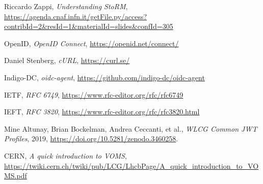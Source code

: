 \begin{thebibliography}{99}
	Riccardo Zappi, \textit{Understanding StoRM},
	\url{https://agenda.cnaf.infn.it/getFile.py/access?contribId=2&resId=1&materialId=slides&confId=305}

	OpenID, 
	\textit{OpenID Connect},
	\url{https://openid.net/connect/}

	Daniel Stenberg, \textit{cURL}, 
	\url{https://curl.se/}

	Indigo-DC, \textit{oidc-agent}, 
	\url{https://github.com/indigo-dc/oidc-agent}

	IETF, 
	\textit{RFC 6749},
	\url{https://www.rfc-editor.org/rfc/rfc6749}

	IEFT,
	\textit{RFC 3820},
	\url{https://www.rfc-editor.org/rfc/rfc3820.html}

	Mine Altunay, Brian Bockelman, Andrea Ceccanti, et al., \textit{WLCG Common JWT Profiles}, 2019,
	\url{https://doi.org/10.5281/zenodo.3460258}.

	CERN, \textit{A quick introduction to VOMS},
	\url{https://twiki.cern.ch/twiki/pub/LCG/LhcbPage/A_quick_introduction_to_VOMS.pdf}

\end{thebibliography}